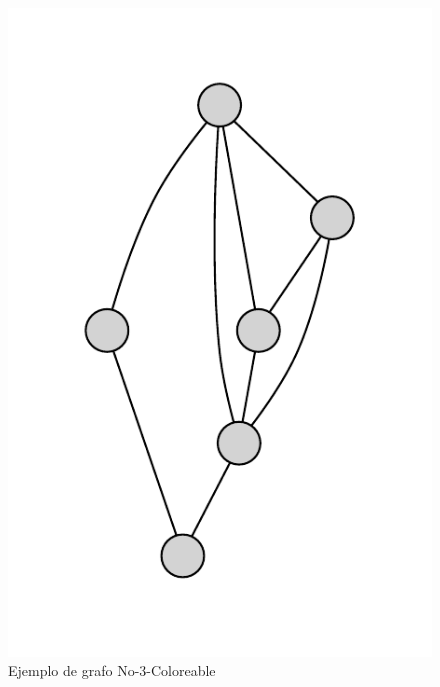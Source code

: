 \begin{figure}[h!]
\centering
\includegraphics[totalheight=0.4\textheight, angle=90]{figuras/clique4.pdf}
\caption[Ejemplo de grafo \textit{No-3-Coloreable}]{Ejemplo de grafo No-3-Coloreable}
\label{noclique}  
\end{figure}
